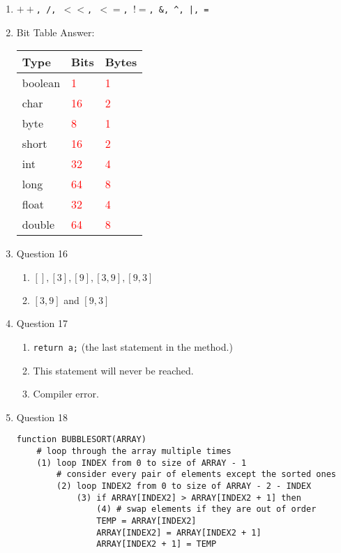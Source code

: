 \documentclass[11pt,addpoints]{exam}
\begin{document}
\begin{enumerate}[resume]
  \item {\tt $++$, /, $<<$, $<=$, $!=$, \&, \textasciicircum, |, =}
  \item Bit Table Answer:

\begin{table}[H]
\centering
\begin{tabular}{|l|l|l|}
  \hline
  Type & Bits & Bytes \\ \hline
  boolean & \textcolor{red}{1} & \textcolor{red}{1} \\ \hline
  char & \textcolor{red}{16} & \textcolor{red}{2} \\ \hline
  byte & \textcolor{red}{8} & \textcolor{red}{1} \\ \hline
  short & \textcolor{red}{16} & \textcolor{red}{2} \\ \hline
  int & \textcolor{red}{32} & \textcolor{red}{4} \\ \hline
  long & \textcolor{red}{64} & \textcolor{red}{8} \\ \hline
  float & \textcolor{red}{32} & \textcolor{red}{4} \\ \hline
  double & \textcolor{red}{64} & \textcolor{red}{8} \\ \hline
\end{tabular}
\end{table}

\item Question 16
  \begin{enumerate}[label=(\Alph*)]
    \item $[], [3], [9], [3, 9], [9, 3]$
    \item $[3, 9]$ and $[9, 3]$
  \end{enumerate}

\item Question 17
  \begin{enumerate}[label=(\alph*)]
    \item {\tt return a;} (the last statement in the method.)
    \item This statement will never be reached.
    \item Compiler error.
  \end{enumerate}

\item Question 18
\begin{verbatim}
function BUBBLESORT(ARRAY)							            
    # loop through the array multiple times
    (1) loop INDEX from 0 to size of ARRAY - 1					    
        # consider every pair of elements except the sorted ones
        (2) loop INDEX2 from 0 to size of ARRAY - 2 - INDEX			
            (3) if ARRAY[INDEX2] > ARRAY[INDEX2 + 1] then			
                (4) # swap elements if they are out of order
                TEMP = ARRAY[INDEX2]						    
                ARRAY[INDEX2] = ARRAY[INDEX2 + 1]				
                ARRAY[INDEX2 + 1] = TEMP					    
\end{verbatim}


\end{enumerate}
\end{document}

